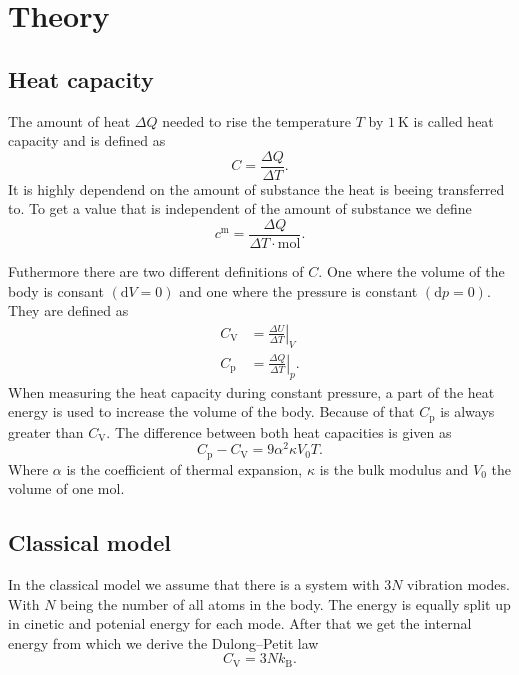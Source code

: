 \section{Theory}
\label{sec:Theory}

\subsection{Heat capacity}
\label{ssec:theory1}

The amount of heat $\Delta Q$ needed to rise the temperature $T$ by $\SI{1}{\kelvin}$ is called heat capacity and is defined as
\begin{equation}
    C = \frac{\Delta Q}{\Delta T}.
    \label{eq:heat}
\end{equation}
It is highly dependend on the amount of substance the heat is beeing transferred to.
To get a value that is independent of the amount of substance we define
\begin{equation}
    c^{\text{m}} = \frac{\Delta Q}{\Delta T \cdot \si{\mol}}.
    \label{eq:heat_mole}
\end{equation}

Futhermore there are two different definitions of $C$.
One where the volume of the body is consant $(\mathrm{d} V = 0)$ and one where the pressure is constant $(\mathrm{d} p = 0)$.
They are defined as 
\begin{align}
    C_\text{V} &= \left. \frac{\Delta U}{\Delta T} \right\vert_{V}\\
    C_\text{p} &= \left. \frac{\Delta Q}{\Delta T} \right\vert_{p}.
\end{align}
When measuring the heat capacity during constant pressure, a part of the heat energy is used to increase the volume of the body.
Because of that $C_\text{p}$ is always greater than $C_\text{V}$.
The difference between both heat capacities is given as
\begin{equation}
    C_\text{p} - C_\text{V} = 9 \alpha ^2 \kappa V_\text{0} T.
    \label{eq:heat_dif}
\end{equation}
Where $\alpha$ is the coefficient of thermal expansion, $\kappa$ is the bulk modulus and $V_\text{0}$ the volume of one mol.

\subsection{Classical model}
\label{ssec:theory2}

In the classical model we assume that there is a system with $3 N$ vibration modes.
With $N$ being the number of all atoms in the body.
The energy is equally split up in cinetic and potenial energy for each mode.
After that we get the internal energy from which we derive the Dulong–Petit law
\begin{equation}
    C_\text{V} = 3 N k_\text{B}.
    \label{eq:dulong}
\end{equation}

